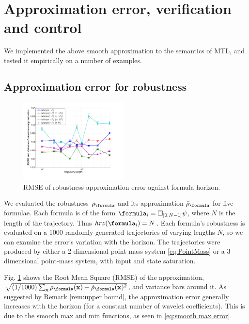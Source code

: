 \section{Approximation error, verification and control}
\label{sec:examples}
We implemented the above smooth approximation to the semantics of MTL, and tested it empirically on a number of examples.

\subsection{Approximation error for robustness}
\label{sec: ex apx error}
\begin{figure}[t]
\centering
\includegraphics[width=0.49\textwidth]{figures/RobustnessError}
\caption{RMSE of robustness approximation error against formula horizon. }
\label{fig:sample result}
\end{figure}

We evaluated the robustness $\robf$ and its approximation $\srobf$ for five formulae.
Each formula is of the form $\formula_i = \always_{[0:N-1]} \psi$, where $N$ is the length of the trajectory.
Thus $hrz(\formula_i)  = N$.
Each formula's robustness is evaluated on a 1000 randomly-generated trajectories of varying lengths $N$, so we can  examine the error's variation with the horizon.
The trajectories were produced by either a 2-dimensional point-mass system \eqref{eq:PointMass} or a 3-dimensional point-mass system, with input and state saturation.

Fig. \ref{fig:sample result} shows the Root Mean Square (RMSE) of the approximation, $\sqrt{(1/1000)\sum_{\sstraj}\robf(\sstraj)-\srobf(\sstraj)^2}$, and variance bars around it.
As suggested by Remark \ref{rem:upper bound}, the approximation error generally increases with the horizon (for a constant number of wavelet coefficients).
This is due to the smooth max and min functions, as seen in \eqref{eq:smooth max error}.

